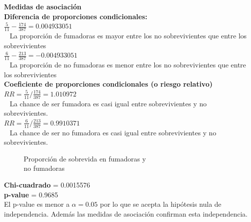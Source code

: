 \documentclass[12pt,letterpaper,fleqn]{article}
\begin{document}
\begin{enumerate}[label=\textbf{\arabic*.}]
\begin{enumerate}[label=\textbf{\alph*.}]
                \textbf{Medidas de asociación} \\
                \textbf{Diferencia de proporciones condicionales:} \\
                $ \frac{5}{11}-\frac{174}{387} = 0.004933051 $ \\ 
                La proporción de fumadoras es mayor entre los no sobrevivientes que entre los sobrevivientes \\
                $ \frac{6}{11}-\frac{213}{387} = -0.004933051 $ \\ 
                La proporción de no fumadoras es menor entre los no sobrevivientes que entre los sobrevivientes\\

                \textbf{Coeficiente de proporciones condicionales (o riesgo relativo)}\\
                 $ RR =  \frac{5}{11}/\frac{174}{387} = 1.010972 $ \\ 
                 La chance de ser fumadora es casi igual entre sobrevivientes y no sobrevivientes.\\
                 $ RR =  \frac{6}{11}/\frac{213}{387} = 0.9910371 $ \\ 
                 La chance de ser no fumadora es casi igual entre sobrevivientes y no sobrevivientes.\\

                \begin{figure}[!htb]
                    \centering
                    
                    \caption{Proporción de sobrevida en fumadoras y \\no fumadoras}
                    \label{fig:figure1}
                \end{figure}
                \FloatBarrier
                \textbf{Chi-cuadrado} = 0.0015576 \\
                \textbf{p-value} = 0.9685 \\
                El p-value es menor a $ \alpha =0.05 $ por lo que se acepta la hipótesis nula de independencia. Además las medidas de asociación confirman esta independencia. \\


\end{enumerate}
\end{enumerate}
\end{document}
